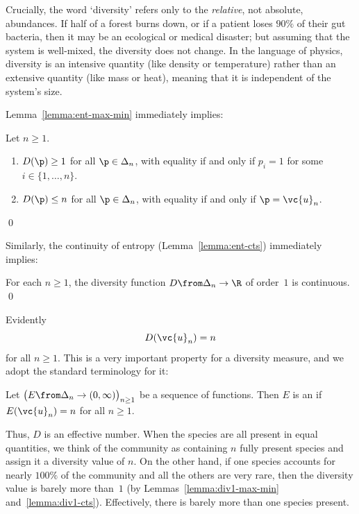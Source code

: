 Crucially, the word `diversity' refers only to the \emph{relative}, not
absolute, abundances.%
%
% 
If half of a forest burns down, or if a patient loses
$90\%$ of their gut%
%
%
% 
bacteria, then it may be an
ecological or medical 
disaster; but assuming that the system is well-mixed, the diversity does
not change.  In the language of physics, diversity is an
intensive%
% 
% 
quantity
(like density or temperature) rather than an extensive%
% 
% 
quantity (like mass or heat), meaning that it is independent of the
system's size.

Lemma~\ref{lemma:ent-max-min} immediately implies:
% 
\begin{lemma}
Let $n \geq 1$.
% 
\begin{enumerate}
\item 
{}
$D(\p) \geq 1$ for all $\p \in \Delta_n$, with equality if and only if $p_i
  = 1$ for some $i \in \{1, \ldots, n\}$. 

\item
{}
$D(\p) \leq n$ for all $\p \in \Delta_n$, with equality if and only if
  $\p = \vc{u}_n$.
\end{enumerate}
\qed
\end{lemma}

Similarly, the continuity of entropy (Lemma~\ref{lemma:ent-cts})
immediately implies:
% 
\begin{lemma}
For each $n \geq 1$, the diversity function $D \from \Delta_n \to \R$ of
order~$1$ is continuous.  
\qed
\end{lemma}

Evidently
\[
D(\vc{u}_n) = n 
\]
for all $n \geq 1$.  This is a very important property for a diversity
measure, and we adopt the standard terminology for it:

\begin{defn}
Let $\bigl( E \from \Delta_n \to (0, \infty) \bigr)_{n \geq 1}$ be a
sequence of functions.  Then $E$ is an  if
$E(\vc{u}_n) = n$ for all $n \geq 1$. 
\end{defn}

Thus, $D$ is an effective number.  When the species are all present in
equal quantities, we think of the community as containing $n$ fully
present species and assign it a diversity value of $n$.  On the other hand,
if one species accounts for nearly $100\%$ of the community and all the
others are very rare, then the diversity value is barely more than~$1$ (by
Lemmas~\ref{lemma:div1-max-min}
and~\ref{lemma:div1-cts}).  Effectively, there is barely more than one
species present.

